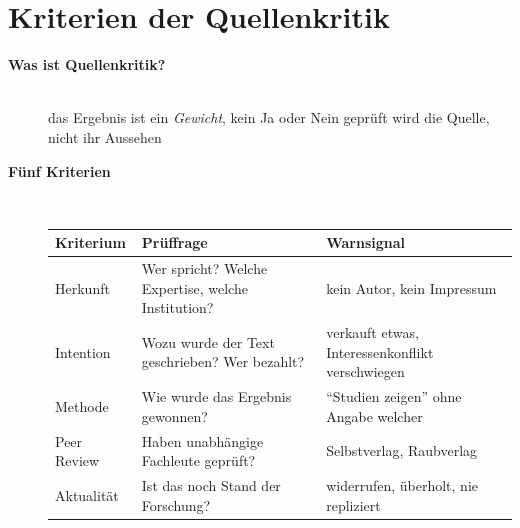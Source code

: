 \section{Kriterien der Quellenkritik}
\begin{description}
\item[{\rot\bf Was ist Quellenkritik?}]~\\
\bi
  \ite das Ergebnis ist ein \emph{Gewicht}, kein Ja oder Nein
  \ite geprüft wird die Quelle, nicht ihr Aussehen
\ei
\os{\newpage}

\item[{\rot\bf Fünf Kriterien}]~\\[-\lblskip]
\begin{center}
\small
\begin{tabular}{@{}p{}p{}p{}@{}}
\toprule
\textbf{Kriterium} & \textbf{Prüffrage} & \textbf{Warnsignal} \\
\midrule
Herkunft & Wer spricht? Welche Expertise, welche Institution? & kein Autor, kein Impressum \\
Intention & Wozu wurde der Text geschrieben? Wer bezahlt? & verkauft etwas, Interessenkonflikt verschwiegen \\
Methode & Wie wurde das Ergebnis gewonnen? & \enquote{Studien zeigen} ohne Angabe welcher \\
Peer Review & Haben unabhängige Fachleute geprüft? & Selbstverlag, Raubverlag \\
Aktualität & Ist das noch Stand der Forschung? & widerrufen, überholt, nie repliziert \\
\bottomrule
\end{tabular}
\end{center}
\os{\newpage}
\end{description}

